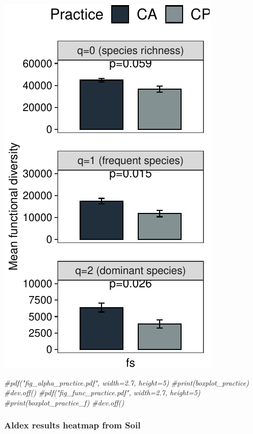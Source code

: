 \documentclass[]{interact}
\theoremstyle{plain}%
\theoremstyle{definition}
\theoremstyle{remark}
\newenvironment{Shaded}{\begin{snugshade}}{\end{snugshade}}
\newcommand{\CommentTok}[1]{\textcolor[rgb]{0.56,0.35,0.01}{\textit{#1}}}
\begin{document}
\begin{center}\includegraphics{Doc_pdf_files/figure-latex/unnamed-chunk-27-2} \end{center}

\begin{Shaded}
\begin{Highlighting}[]
\CommentTok{\#pdf("fig\_alpha\_practice.pdf", width=2.7, height=5)}
\CommentTok{\#print(boxplot\_practice)}
\CommentTok{\#dev.off()}
\CommentTok{\#pdf("fig\_func\_practice.pdf", width=2.7, height=5)}
\CommentTok{\#print(boxplot\_practice\_f)}
\CommentTok{\#dev.off()}
\end{Highlighting}
\end{Shaded}

\hypertarget{aldex-results-heatmap-from-soil-1}{%
\subsubsection{Aldex results heatmap from
Soil}\label{aldex-results-heatmap-from-soil-1}}
\end{document}
